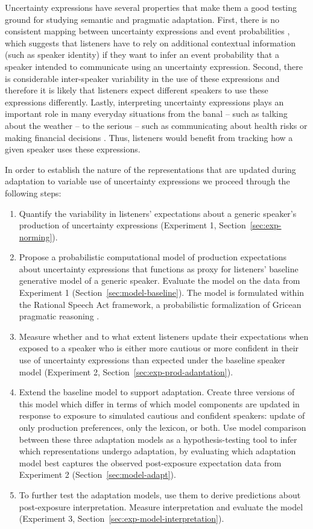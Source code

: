 \documentclass[man, floatsintext]{apa6}
\newcommand{\sectionref}[1]{Section~\ref{#1}}
\begin{document}
Uncertainty expressions have several properties that make them a good testing ground for studying semantic and pragmatic
adaptation. First, there is no consistent mapping between uncertainty expressions and event probabilities \parencite[e.g.,][]{Clark1990,Pepper1974}, which suggests that listeners have to rely on additional contextual information (such as speaker identity)
if they want to infer an event probability that a speaker intended to communicate using an uncertainty expression. Second, there is considerable inter-speaker variability 
in the use of these expressions \parencite{Wallsten1986} and therefore it is likely that listeners expect different speakers to use these expressions
differently. Lastly, interpreting uncertainty expressions plays an important role in many everyday situations from the banal -- such as talking about the weather -- to the serious -- such as communicating about health risks \parencite{Berry2004, Lipkus2007, Politi2007} or making financial decisions \parencite{Doupnik2003}. 
Thus, listeners would benefit from tracking  how a given speaker uses these expressions. 

In order to establish the nature of the representations that are updated during adaptation to variable use of uncertainty expressions we proceed through the following steps:
\begin{enumerate}
	\item Quantify the variability in listeners' expectations about a generic speaker's production of uncertainty expressions (Experiment 1, \sectionref{sec:exp-norming}).
	\item Propose a probabilistic computational model of production expectations about uncertainty expressions that functions as proxy for listeners' baseline generative model of a generic speaker. Evaluate the model on the data from Experiment 1 (\sectionref{sec:model-baseline}). The model is formulated within the Rational Speech Act framework, a probabilistic formalization of Gricean pragmatic reasoning   \parencite{Frank2012,Goodman2016,Franke2016}.
	\item Measure whether and to what extent listeners update their expectations when exposed to a speaker who is either more cautious or more confident in their use of uncertainty expressions than expected under the baseline speaker model (Experiment 2, \sectionref{sec:exp-prod-adaptation}).
	\item Extend the baseline model to support adaptation. Create three versions of this model which differ in terms of which model components are updated in response to exposure to simulated cautious and confident speakers: update of only production preferences, only the lexicon, or both. Use model comparison between these three adaptation models as a hypothesis-testing tool to infer which representations undergo adaptation, by evaluating which adaptation model best captures the observed post-exposure expectation data from Experiment 2 (\sectionref{sec:model-adapt}).
	\item To further test the adaptation models, use them to derive predictions about post-exposure interpretation. Measure interpretation and evaluate the model (Experiment 3, \sectionref{sec:exp-model-interpretation}).
\end{enumerate}
\end{document}
